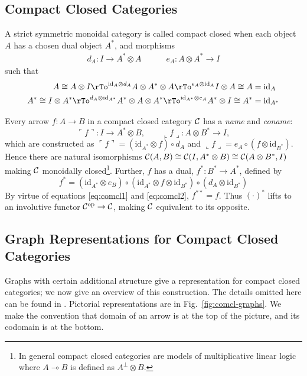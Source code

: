 \documentclass[runningheads]{llncs}
\newcommand{\iso}{\cong}
\newcommand{\name}[1]{%
\ulcorner #1 \urcorner}
\newcommand{\coname}[1]{%
\llcorner #1 \lrcorner}
\newcommand{\catC}{\ensuremath{{\cal C}}\xspace}
\newcommand{\id}[1]{\ensuremath{\mathrm{id}_{#1}}}
\begin{document}
\subsection{Compact Closed Categories}
\label{sec:comp-clos-categ}

\begin{definition}
\label{compactcat-def}
A strict symmetric monoidal  category
\cite{MacLane:CatsWM:1971,AspLon:CatTypStruct:1991} is called compact 
closed \cite{KelLap:comcl:1980} when each object $A$ has a chosen dual
object $A^*$, and morphisms
\begin{gather*}
  d_A : I \to A^* \otimes A \quad\quad\quad e_A : A \otimes A^* \to I
\end{gather*}
such that
\begin{align}
  A \iso A \otimes I \rTo^{\id{A} \otimes d_A} A \otimes A^* \otimes A
  \rTo^{e_A \otimes \id{A}} I \otimes A \iso A & = \id{A} \label{eq:comcl1}\\
  A^* \iso I \otimes A^* \rTo^{ d_A \otimes \id{A^*}} A^* \otimes A
  \otimes A^* \rTo^{\id{A^*} \otimes e_A} A^* \otimes I \iso A^* & =
  \id{A^*} \label{eq:comcl2}
\end{align}
\end{definition}

Every arrow $f:A\to B$ in a compact closed category \catC
has a \emph{name} and \emph{coname}:
\[
\name{f} : I \to A^* \otimes B, \qquad \coname{f} : A \otimes  B^* \to I,
\]
which are constructed as $\name{f} = (\id{A^*}\otimes f) \circ d_A$ and
$\coname{f} = e_A \circ (f \otimes \id{B^*})$.  Hence there are natural
isomorphisms $\catC(A,B) \iso \catC(I,A^*\otimes B) \iso
\catC(A\otimes B^*,I)$ making \catC monoidally closed\footnote{In
  general compact closed categories  are models of multiplicative
  linear logic where $A \multimap B$ is defined as $A^\bot \otimes B$.}.
Further,  $f$ has a dual, $f^* : B^* \to A^*$, defined by 
\[
f^* = (\id{A^*} \otimes e_B) \circ (\id{A^*}\otimes f \otimes
\id{B^*}) \circ (d_A \otimes \id{B^*})
\]
By virtue of equations \eqref{eq:comcl1} and \eqref{eq:comcl2}, $f^{**} =
f$.  Thus $(\cdot)^*$ lifts to an involutive functor
$\catC^{\text{op}} \to \catC$,  making $\catC$ equivalent to its
opposite.

\subsection{Graph Representations for Compact Closed Categories}
\label{sec:graph-repr-comp}

Graphs with certain additional structure give a representation for
compact closed categories; we now give an overview of this
construction.  The details omitted here can be found in
\cite{Duncan:thesis:2006}.  Pictorial representations are in
Fig.~\ref{fig:comcl-graphs}. We make the convention that domain of an
arrow is at the top of the picture, and its codomain is at the bottom.
\end{document}
